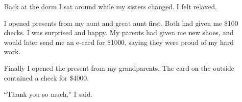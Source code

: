 Back at the dorm I sat around while my sisters changed.  I felt relaxed.

I opened presents from my aunt and great aunt first.  Both had given me \$100
checks.  I was surprised and happy.  My parents had given me new shoes, and
would later send me an e-card for \$1000, saying they were proud of my hard
work.  

Finally I opened the present from my grandparents.  The card on the outside
contained a check for \$4000.  

``Thank you so much,'' I said.
